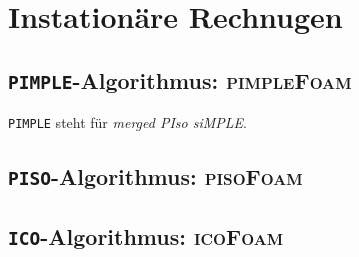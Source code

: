 \chapter{Instationäre Rechnugen}

\section{\texttt{PIMPLE}-Algorithmus: \textsc{pimpleFoam}}

\texttt{PIMPLE} steht für \textit{merged PIso siMPLE}.

\section{\texttt{PISO}-Algorithmus: \textsc{pisoFoam}}

\section{\texttt{ICO}-Algorithmus: \textsc{icoFoam}}

\newpage